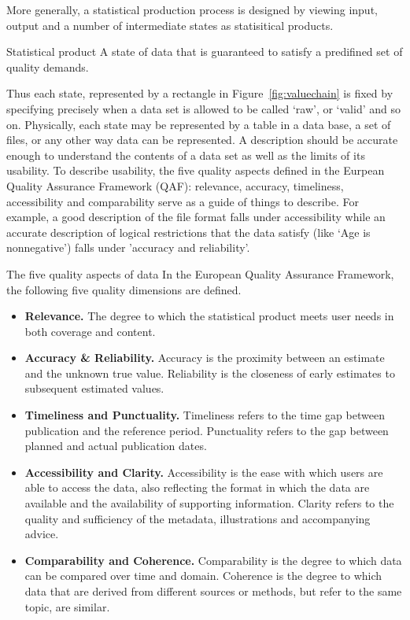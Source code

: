 More generally, a statistical production process is designed by viewing
input, output and a number of intermediate states as statisitical products.
\begin{terminology}{Statistical product}
A state of data that is guaranteed to satisfy a predifined set of quality
demands. 
\end{terminology}
Thus each state, represented by a rectangle in Figure~\ref{fig:valuechain} is
fixed by specifying precisely when a data set is allowed to be called `raw', or
`valid' and so on. Physically, each state may be represented by a table in a
data base, a set of files, or any other way data can be represented. A
description should be accurate enough to understand the contents of a data set
as well as the limits of its usability. To describe usability, the five quality
aspects defined in the Eurpean Quality Assurance Framework (QAF): relevance,
accuracy, timeliness, accessibility and comparability serve as a guide of
things to describe. For example, a good description of the file format falls
under accessibility while an accurate description of logical restrictions that
the data satisfy (like `Age is nonnegative') falls under 'accuracy and
reliability'.


\begin{terminology}{The five quality aspects of data}
  In the European Quality Assurance Framework, the following five quality 
  dimensions are defined.
  \begin{itemize}
    \item\textbf{Relevance.} The degree to which the statistical product meets
    user needs in both coverage
    and content.
    \item\textbf{Accuracy \& Reliability.} Accuracy is the proximity between an estimate
    and the unknown true value. Reliability is the closeness of early estimates to
    subsequent estimated values.
    \item\textbf{Timeliness and Punctuality.} Timeliness refers to the time gap between
    publication and the reference period. Punctuality refers to the gap between
    planned and actual publication dates.
    \item\textbf{Accessibility and Clarity.} Accessibility is the ease with which users are
    able to access the data, also reflecting the format in which the data are
    available and the availability of supporting information. Clarity refers to the
    quality and sufficiency of the metadata, illustrations and accompanying advice.
    \item\textbf{Comparability and Coherence.} Comparability is the degree to which data
    can be compared over time and domain. Coherence is the degree to which data
    that are derived from different sources or methods, but refer to the same
    topic, are similar.
  \end{itemize}
\end{terminology}

